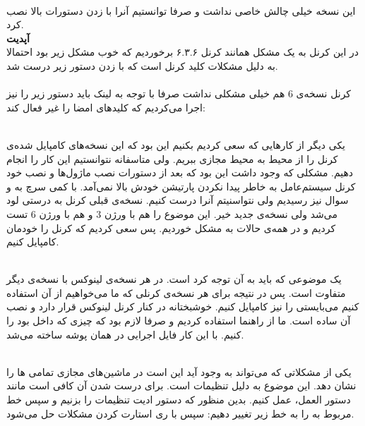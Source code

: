\\\noindent
این نسخه خیلی چالش خاصی نداشت و صرفا توانستیم آنرا با زدن دستورات بالا نصب کرد.
\\
\textbf{آپدیت}
\\
در این کرنل به یک مشکل همانند کرنل ۶.۳.۶ برخوردیم که خوب مشکل زیر بود 
احتمالا به دلیل مشکلات کلید کرنل است که با زدن دستور زیر درست شد.
\\
\\\noindent
کرنل نسخه‌ی 6 هم خیلی مشکلی نداشت صرفا با توجه به
لینک باید دستور زیر را نیز اجرا می‌کردیم که کلید‌های امضا را غیر فعال کند:

\\\noindent
یکی دیگر از کار‌هایی که سعی کردیم بکنیم این بود که این نسخه‌های کامپایل شده‌ی کرنل را از محیط
به محیط مجازی ببریم. ولی متاسفانه نتوانستیم این کار را انجام دهیم. مشکلی که وجود داشت این بود که بعد از
دستورات نصب ماژول‌ها و نصب خود کرنل سیستم‌عامل به خاطر پیدا نکردن پارتیشن خودش بالا نمی‌آمد. با کمی سرچ به
و
سوال نیز رسیدیم ولی نتواسنیتم آنرا درست کنیم. نسخه‌ی قبلی کرنل به درستی لود می‌شد ولی نسخه‌ی جدید خیر.
این موضوع را هم با ورژن 3 و هم با ورژن 6 تست کردیم و در همه‌ی حالات به مشکل خوردیم. پس سعی کردیم که کرنل
را خودمان کامپایل کنیم.

\\\noindent
یک موضوعی که باید به آن توجه کرد
است.
در هر نسخه‌ی لینوکس با نسخه‌ی دیگر متفاوت است. پس در نتیجه برای هر نسخه‌ی کرنلی که ما می‌خواهیم از آن استفاده
کنیم می‌بایستی
را نیز کامپایل کنیم. خوشبختانه
در کنار کرنل لینوکس قرار دارد و نصب آن ساده است. ما از
راهنما استفاده کردیم و صرفا لازم بود که چیزی که داخل
بود را
کنیم. با این کار فایل اجرایی
در همان پوشه ساخته می‌شد.

\\\noindent
یکی از مشکلاتی که می‌تواند به وجود آید این است در ماشین‌های مجازی
تمامی
ها را
نشان دهد. این موضوع به دلیل تنظیمات
است. برای درست شدن آن کافی است مانند 
دستور العمل،‌ عمل کنیم. بدین منظور که دستور ادیت تنظیمات
را بزنیم و سپس خط مربوط به
را به خط زیر تغییر دهیم:
سپس با ری استارت کردن
مشکلات حل می‌شود.

